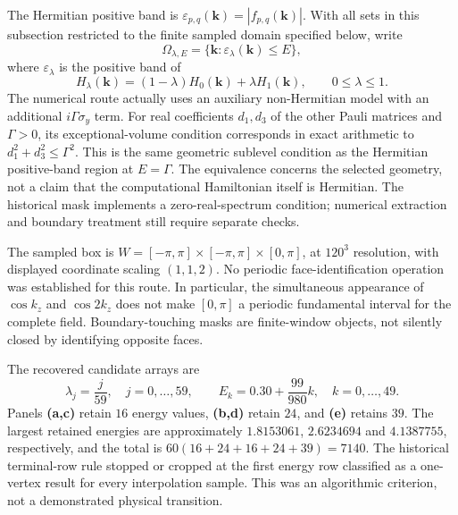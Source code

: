 The Hermitian positive band is $\varepsilon_{p,q}(\mathbf k)=|f_{p,q}(\mathbf k)|$. With all sets in this subsection restricted to the finite sampled domain specified below, write
\begin{equation}
\Omega_{\lambda,E}=\{\mathbf k:\varepsilon_\lambda(\mathbf k)\leq E\},
\label{suppeq:fermi_volume_phase_map}
\end{equation}
where $\varepsilon_\lambda$ is the positive band of
\begin{equation}
H_\lambda(\mathbf k)=(1-\lambda)H_0(\mathbf k)+\lambda H_1(\mathbf k),\qquad 0\leq\lambda\leq1.
\label{suppeq:phase_map_interpolation}
\end{equation}
The numerical route actually uses an auxiliary non-Hermitian model with an additional $i\Gamma\sigma_y$ term. For real coefficients $d_1,d_3$ of the other Pauli matrices and $\Gamma>0$, its exceptional-volume condition corresponds in exact arithmetic to $d_1^2+d_3^2\leq\Gamma^2$. This is the same geometric sublevel condition as the Hermitian positive-band region at $E=\Gamma$. The equivalence concerns the selected geometry, not a claim that the computational Hamiltonian itself is Hermitian. The historical mask implements a zero-real-spectrum condition; numerical extraction and boundary treatment still require separate checks.

The sampled box is $W=[-\pi,\pi]\times[-\pi,\pi]\times[0,\pi]$, at $120^3$ resolution, with displayed coordinate scaling $(1,1,2)$. No periodic face-identification operation was established for this route. In particular, the simultaneous appearance of $\cos k_z$ and $\cos 2k_z$ does not make $[0,\pi]$ a periodic fundamental interval for the complete field. Boundary-touching masks are finite-window objects, not silently closed by identifying opposite faces.

The recovered candidate arrays are
\begin{equation}
\lambda_j=\frac{j}{59},\quad j=0,\ldots,59,
\qquad E_k=0.30+\frac{99}{980}k,\quad k=0,\ldots,49.
\label{suppeq:hamiltonian_sampling}
\end{equation}
Panels \textbf{(a,c)} retain $16$ energy values, \textbf{(b,d)} retain $24$, and \textbf{(e)} retains $39$. The largest retained energies are approximately $1.8153061$, $2.6234694$ and $4.1387755$, respectively, and the total is $60(16+24+16+24+39)=7140$. The historical terminal-row rule stopped or cropped at the first energy row classified as a one-vertex result for every interpolation sample. This was an algorithmic criterion, not a demonstrated physical transition.


